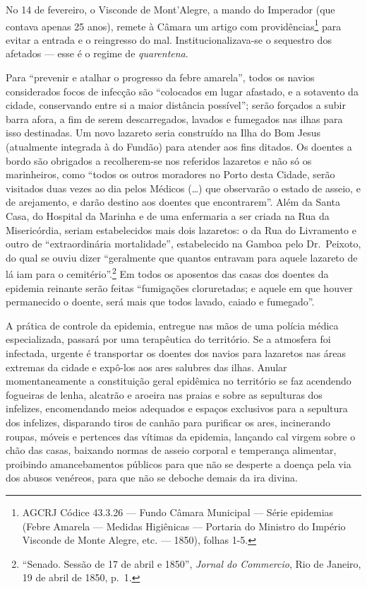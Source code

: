 No 14 de fevereiro, o Visconde de Mont'Alegre, a mando do Imperador (que
contava apenas 25 anos), remete à Câmara um artigo com
providências\footnote{AGCRJ Códice 43.3.26 --- Fundo Câmara Municipal ---
  Série epidemias (Febre Amarela --- Medidas Higiênicas --- Portaria do
  Ministro do Império Visconde de Monte Alegre, etc. --- 1850), folhas
  1-5.} para evitar a entrada e o reingresso do mal.
Institucionalizava-se o sequestro dos afetados --- esse é o regime de
\textit{quarentena}.

Para ``prevenir e atalhar o progresso da febre amarela'', todos os
navios considerados focos de infecção são ``colocados em lugar afastado,
e a sotavento da cidade, conservando entre si a maior distância
possível''; serão forçados a subir barra afora, a fim de serem
descarregados, lavados e fumegados nas ilhas para isso destinadas. Um
novo lazareto seria construído na Ilha do Bom Jesus (atualmente
integrada à do Fundão) para atender aos fins ditados. Os doentes a bordo
são obrigados a recolherem-se nos referidos lazaretos e não só os
marinheiros, como ``todos os outros moradores no Porto desta Cidade,
serão visitados duas vezes ao dia pelos Médicos (\ldots{}) que
observarão o estado de asseio, e de arejamento, e darão destino aos
doentes que encontrarem''. Além da Santa Casa, do Hospital da Marinha e
de uma enfermaria a ser criada na Rua da Misericórdia, seriam
estabelecidos mais dois lazaretos: o da Rua do Livramento e outro de
``extraordinária mortalidade'', estabelecido na Gamboa pelo Dr.~Peixoto,
do qual se ouviu dizer ``geralmente que quantos entravam para aquele
lazareto de lá iam para o cemitério''.\footnote{``Senado. Sessão de 17
  de abril e 1850'', \textit{Jornal do Commercio}, Rio de Janeiro, 19 de
  abril de 1850, p.~1.} Em todos os aposentos das casas dos doentes da
epidemia reinante serão feitas ``fumigações cloruretadas; e aquele em
que houver permanecido o doente, será mais que todos lavado, caiado e
fumegado''.

A prática de controle da epidemia, entregue nas mãos de uma polícia
médica especializada, passará por uma terapêutica do território. Se a
atmosfera foi infectada, urgente é transportar os doentes dos navios
para lazaretos nas áreas extremas da cidade e expô-los aos ares salubres
das ilhas. Anular momentaneamente a constituição geral epidêmica no
território se faz acendendo fogueiras de lenha, alcatrão e aroeira nas
praias e sobre as sepulturas dos infelizes, encomendando meios adequados
e espaços exclusivos para a sepultura dos infelizes, disparando tiros de
canhão para purificar os ares, incinerando roupas, móveis e pertences
das vítimas da epidemia, lançando cal virgem sobre o chão das casas,
baixando normas de asseio corporal e temperança alimentar, proibindo
amancebamentos públicos para que não se desperte a doença pela via dos
abusos venéreos, para que não se deboche demais da ira divina.


